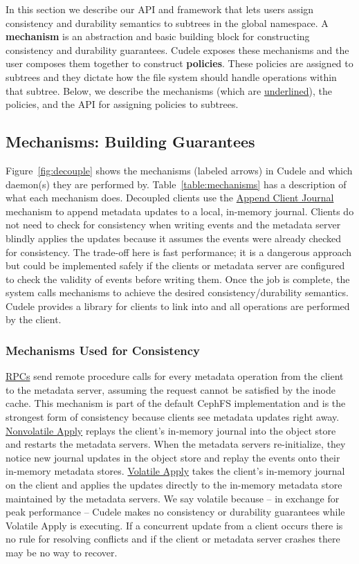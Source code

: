 In this section we describe our API and framework that lets users
assign consistency and durability semantics to subtrees in the global
namespace. A \textbf{mechanism} is an abstraction and basic building block for
constructing consistency and durability guarantees. Cudele exposes these
mechanisms and the user composes them together to construct \textbf{policies}.
These policies are assigned to subtrees and they dictate how the file system
should handle operations within that subtree.  Below, we describe the
mechanisms (which are \underline{underlined}), the policies, and the API for assigning
policies to subtrees.

\subsection{Mechanisms: Building Guarantees}
\label{sec:the-cudelesfs-mechanisms}

Figure~\ref{fig:decouple} shows the mechanisms (labeled arrows) in Cudele and
which daemon(s) they are performed by.  Table~\ref{table:mechanisms} has a
description of what each mechanism does.  Decoupled clients use the
\underline{Append Client Journal} mechanism to append metadata updates to a
local, in-memory journal. Clients do not need to check for
consistency when writing events and the metadata server blindly applies the
updates because it assumes the events were already checked for consistency. The
trade-off here is fast performance; it is a dangerous approach but could be
implemented safely if the clients or metadata server are configured to check
the validity of events before writing them.  Once the job is complete, the
system calls mechanisms to achieve the desired consistency/durability
semantics.  Cudele provides a library for clients to link into and all
operations are performed by the client.  

\subsubsection{Mechanisms Used for Consistency} \underline{RPCs} send remote
procedure calls for every metadata operation from the client to the metadata
server, assuming the request cannot be satisfied by the inode cache. This
mechanism is part of the default CephFS implementation and is the strongest
form of consistency because clients see metadata updates right away.
\underline{Nonvolatile Apply} replays the client's in-memory journal into the
object store and restarts the metadata servers. When the metadata servers
re-initialize, they notice new journal updates in the object store and replay
the events onto their in-memory metadata stores.  \underline{Volatile Apply}
takes the client's in-memory journal on the client and applies the updates
directly to the in-memory metadata store maintained by the metadata servers. We
say volatile because -- in exchange for peak performance -- Cudele makes no
consistency or durability guarantees while Volatile Apply is executing.  If a
concurrent update from a client occurs there is no rule for resolving conflicts
and if the client or metadata server crashes there may be no way to recover.

